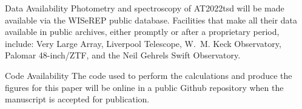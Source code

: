 \documentclass{nature_plusfigure}
\begin{document}
\begin{addendum}
 \item[Data Availability] Photometry and spectroscopy of AT2022tsd will be made available via the WISeREP public database. Facilities that make all their data available in public archives, either promptly or after a proprietary period, include: Very Large Array, Liverpool Telescope, W.~M. Keck Observatory, Palomar 48-inch/ZTF, 
 and the Neil Gehrels Swift Observatory. 

 \item[Code Availability] The code used to perform the calculations and produce the figures for this paper will be online in a public Github repository when the manuscript is accepted for publication.%

\end{addendum}


\clearpage
\newpage
\end{document}
